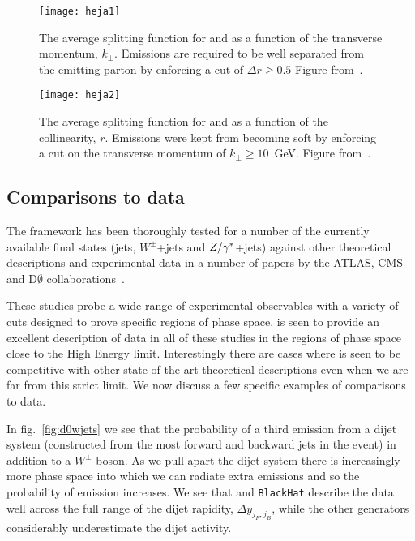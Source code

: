 		\begin{figure}[hbt]
			\centering
			\texttt{[image: heja1]}
			\caption{The average splitting function for \HEJ and \ARIADNE as a function of the transverse momentum, $k_\perp$.
			Emissions are required to be well separated from the emitting parton by enforcing a cut of $\Delta r\geq0.5$
			Figure from~\cite{Andersen:2011zd}.}
			\label{fig:heja1}
		\end{figure}

		\begin{figure}[hbt]
			\centering
			\texttt{[image: heja2]}
			\caption{The average splitting function for \HEJ and \ARIADNE as a function of the collinearity, $r$.
			Emissions were kept from becoming soft by enforcing a cut on the transverse momentum of $k_\perp\geq10$~GeV.
			Figure from~\cite{Andersen:2011zd}.}
			\label{fig:heja2}
		\end{figure}

	\subsection{Comparisons to data}

		The \hej framework has been thoroughly tested for a number of the currently available final states (jets,
		$W^\pm$+jets and $Z/\gamma^*$+jets) against other theoretical descriptions and experimental data in a number of
		papers by the ATLAS, CMS and D$\emptyset$ collaborations~\cite{Aad:2011jz,Aad:2014pua,Aad:2014qxa,Aad:2014rta,
		Chatrchyan:2012gwa,Abazov:2013gpa,ZPaper}.

		These studies probe a wide range of experimental observables with a variety of cuts designed to prove
		specific regions of phase space. \hej is seen to provide an excellent description of data in all of these
		studies in the regions of phase space close to the High Energy limit.  Interestingly there are cases where
		\HEJ is seen to be competitive with other state-of-the-art theoretical descriptions even when we are far from
		this strict limit. We now discuss a few specific examples of comparisons to data.

		In fig.~\eqref{fig:d0wjets} we see that the probability of a third emission from a dijet system (constructed
		from the most forward and backward jets in the event) in addition to a $W^\pm$ boson.  As we pull apart the
		dijet system there is increasingly more phase space into which we can radiate extra emissions and so the
		probability of emission increases.  We see that \HEJ and \texttt{BlackHat} describe the data well across
		the full range of the dijet rapidity, $\Delta y_{j_F, j_B}$, while the other generators considerably
		underestimate the dijet activity.

